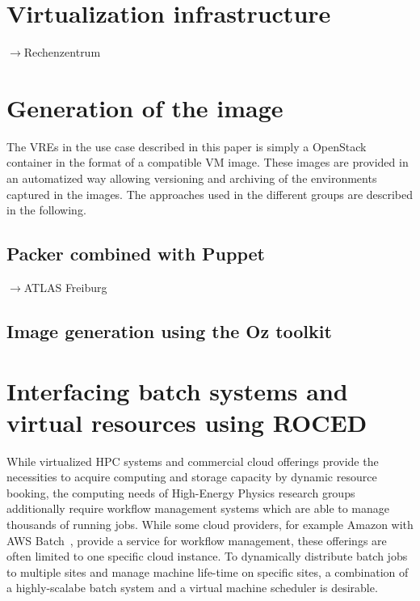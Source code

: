 \section{Virtualization infrastructure}
\label{sec:openstack}
$\to$Rechenzentrum\\

\section{Generation of the image}
The VREs in the use case described in this paper is simply a OpenStack container
in the format of a compatible VM image.
These images are provided in an automatized
way allowing versioning and archiving of the environments captured in
the images. The approaches used in the
different groups are described in the following.

\subsection{Packer combined with Puppet}
$\to$ATLAS Freiburg\\




\subsection{Image generation using the Oz toolkit}


\section{Interfacing batch systems and virtual resources using ROCED}
While virtualized HPC systems and commercial cloud offerings provide the necessities to acquire computing and storage capacity by dynamic resource booking, the computing needs of High-Energy Physics research groups additionally require workflow management systems which are able to manage thousands of running jobs. While some cloud providers, for example Amazon with AWS Batch~\cite{awsbatch}, provide a service for workflow management, these offerings are often limited to one specific cloud instance. To dynamically distribute batch jobs to multiple sites and manage machine life-time on specific sites, a combination of a highly-scalabe batch system and a virtual machine scheduler is desirable.

